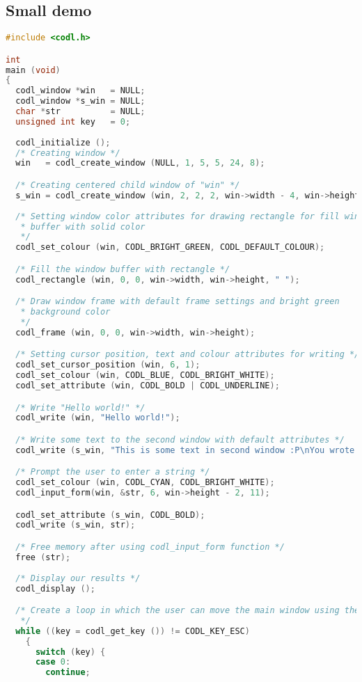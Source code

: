 \documentclass{article}
\begin{document}
\subsection{Small demo}

\begin{lstlisting}[language=C]
#include <codl.h>

int
main (void)
{
  codl_window *win   = NULL;
  codl_window *s_win = NULL;
  char *str          = NULL;
  unsigned int key   = 0;
  
  codl_initialize ();
  /* Creating window */
  win   = codl_create_window (NULL, 1, 5, 5, 24, 8);

  /* Creating centered child window of "win" */
  s_win = codl_create_window (win, 2, 2, 2, win->width - 4, win->height - 4);
  
  /* Setting window color attributes for drawing rectangle for fill window 
   * buffer with solid color 
   */
  codl_set_colour (win, CODL_BRIGHT_GREEN, CODL_DEFAULT_COLOUR);

  /* Fill the window buffer with rectangle */
  codl_rectangle (win, 0, 0, win->width, win->height, " ");

  /* Draw window frame with default frame settings and bright green 
   * background color 
   */
  codl_frame (win, 0, 0, win->width, win->height);

  /* Setting cursor position, text and colour attributes for writing */
  codl_set_cursor_position (win, 6, 1);
  codl_set_colour (win, CODL_BLUE, CODL_BRIGHT_WHITE);
  codl_set_attribute (win, CODL_BOLD | CODL_UNDERLINE);

  /* Write "Hello world!" */
  codl_write (win, "Hello world!");

  /* Write some text to the second window with default attributes */
  codl_write (s_win, "This is some text in second window :P\nYou wrote: ");

  /* Prompt the user to enter a string */
  codl_set_colour (win, CODL_CYAN, CODL_BRIGHT_WHITE);
  codl_input_form(win, &str, 6, win->height - 2, 11);

  codl_set_attribute (s_win, CODL_BOLD);
  codl_write (s_win, str);

  /* Free memory after using codl_input_form function */
  free (str);
  
  /* Display our results */
  codl_display ();

  /* Create a loop in which the user can move the main window using the arrows
   */
  while ((key = codl_get_key ()) != CODL_KEY_ESC)
    {
      switch (key) {
      case 0:
        continue;
        

\end{lstlisting}
\end{document}
